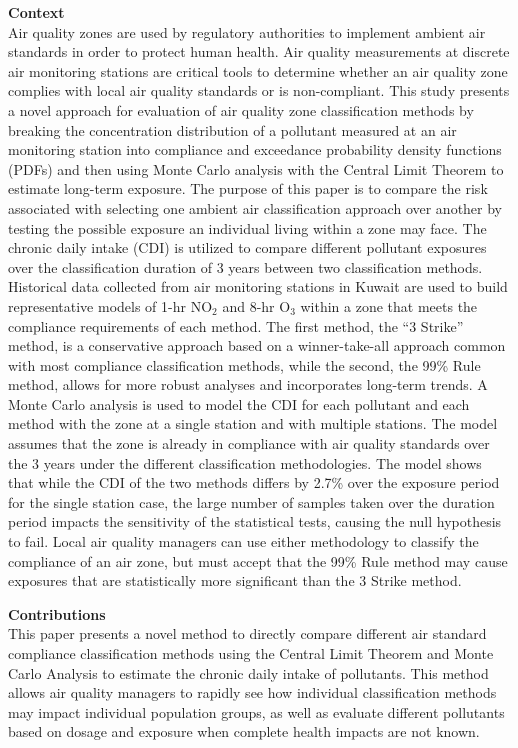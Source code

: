\vspace{5mm}
\noindent
\textbf{Context}\\
\noindent
Air quality zones are used by regulatory authorities to implement ambient air standards in order to protect human health. Air quality measurements at discrete air monitoring stations are critical tools to determine whether an air quality zone complies with local air quality standards or is non-compliant. This study presents a novel approach for evaluation of air quality zone classification methods by breaking the concentration distribution of a pollutant measured at an air monitoring station into compliance and exceedance probability density functions (PDFs) and then using Monte Carlo analysis with the Central Limit Theorem to estimate long-term exposure. The purpose of this paper is to compare the risk associated with selecting one ambient air classification approach over another by testing the possible exposure an individual living within a zone may face. The chronic daily intake (CDI) is utilized to compare different pollutant exposures over the classification duration of 3 years between two classification methods. Historical data collected from air monitoring stations in Kuwait are used to build representative models of 1-hr NO$_{2}$ and 8-hr O$_{3}$ within a zone that meets the compliance requirements of each method. The first
method, the “3 Strike” method, is a conservative approach based on a winner-take-all approach common with most compliance classification methods, while the second, the 99\% Rule method, allows for more robust analyses and incorporates long-term trends. A Monte Carlo analysis is used to model the CDI for each pollutant and each method with the zone at a single station and with multiple stations. The model assumes that the zone is already in compliance with air quality standards over the 3 years under the different classification methodologies. The model shows that while the CDI of the two methods differs by 2.7\% over the exposure period for the single station case, the large number of samples taken over the duration period impacts the sensitivity of the statistical tests, causing the null hypothesis to fail. Local air quality managers can use either methodology to classify the compliance of an air zone, but must accept that the 99\% Rule method may cause exposures that are statistically more significant than the 3 Strike method. 

\vspace{5mm}
\noindent
\textbf{Contributions}\\
\noindent
This paper presents a novel method to directly compare different air standard compliance classification methods using the Central Limit Theorem and Monte Carlo Analysis to estimate the chronic daily intake of pollutants. This method allows air quality managers to rapidly see how individual classification methods may impact individual population groups, as well as evaluate different pollutants based on dosage and exposure when complete health impacts are not known.

